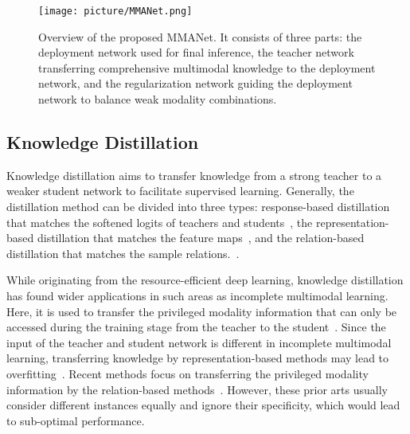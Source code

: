 \documentclass[10pt,twocolumn,letterpaper]{article}
\begin{document}
\begin{figure*}[ht]
\centering
\texttt{[image: picture/MMANet.png]} \caption{Overview of the proposed MMANet. It consists of three parts: the deployment network used for final inference, the teacher network transferring comprehensive multimodal knowledge to the deployment network, and the regularization network guiding the deployment network to balance weak modality combinations.}
\label{MMANET}
\end{figure*}




\subsection{Knowledge Distillation}

Knowledge distillation aims to transfer knowledge from a strong teacher to a weaker student network to facilitate supervised learning. Generally, the distillation method can be divided into three types: response-based distillation that matches the softened logits of teachers and students~\cite{Distilling}, the representation-based distillation that matches the feature maps~\cite{hint,hint1,hint2}, and the relation-based distillation that matches the sample relations.~\cite{pkt,relation-sp}.







While originating from the resource-efficient deep learning, knowledge distillation has found wider applications in such areas as incomplete multimodal learning. Here, it is used to transfer the privileged modality information that can only be accessed during the training stage from the teacher to the student~\cite{special-hall1,special-hall2}. Since the input of the teacher and student network is different in incomplete multimodal learning, transferring knowledge by representation-based methods may lead to overfitting~\cite{special-hall7}. Recent methods focus on transferring the privileged modality information by the relation-based methods~\cite{acn,acn2,acn3}. However, these prior arts usually consider different instances equally and ignore their specificity, which would lead to sub-optimal performance.
\end{document}
